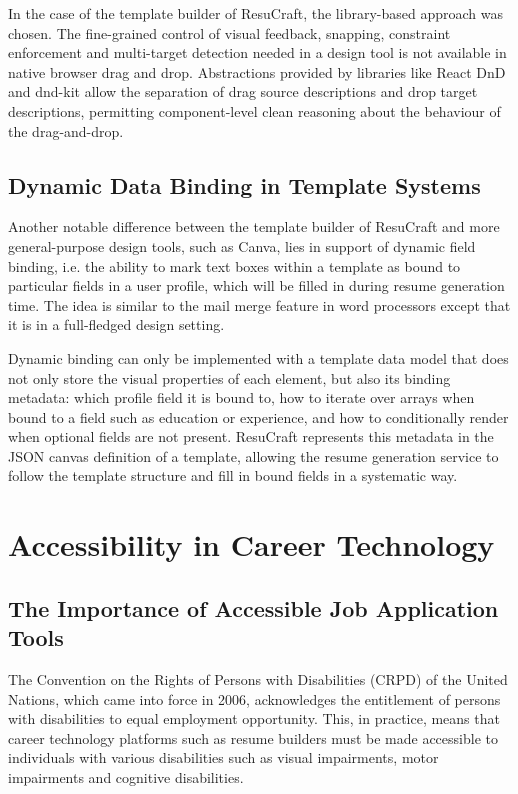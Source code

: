 \documentclass[12pt, a4paper, oneside]{report}
\begin{document}
In the case of the template builder of ResuCraft, the library-based approach was chosen. The fine-grained control of visual feedback, snapping, constraint enforcement and multi-target detection needed in a design tool is not available in native browser drag and drop. Abstractions provided by libraries like React DnD and dnd-kit allow the separation of drag source descriptions and drop target descriptions, permitting component-level clean reasoning about the behaviour of the drag-and-drop.

\subsection{Dynamic Data Binding in Template Systems}

Another notable difference between the template builder of ResuCraft and more general-purpose design tools, such as Canva, lies in support of dynamic field binding, i.e. the ability to mark text boxes within a template as bound to particular fields in a user profile, which will be filled in during resume generation time. The idea is similar to the mail merge feature in word processors except that it is in a full-fledged design setting.

Dynamic binding can only be implemented with a template data model that does not only store the visual properties of each element, but also its binding metadata: which profile field it is bound to, how to iterate over arrays when bound to a field such as education or experience, and how to conditionally render when optional fields are not present. ResuCraft represents this metadata in the JSON canvas definition of a template, allowing the resume generation service to follow the template structure and fill in bound fields in a systematic way.

\section{Accessibility in Career Technology}

\subsection{The Importance of Accessible Job Application Tools}

The Convention on the Rights of Persons with Disabilities (CRPD) of the United Nations\cite{crpd2006}, which came into force in 2006, acknowledges the entitlement of persons with disabilities to equal employment opportunity. This, in practice, means that career technology platforms such as resume builders must be made accessible to individuals with various disabilities such as visual impairments, motor impairments and cognitive disabilities.
\end{document}
